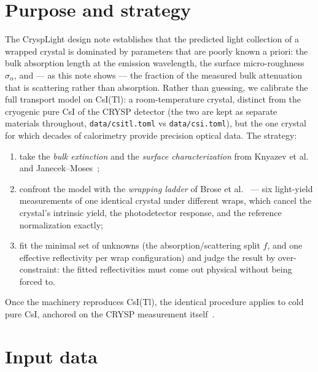\documentclass[11pt,a4paper]{article}
\newcommand{\csitl}{CsI(Tl)}
\newcommand{\sa}{\sigma_\alpha}
\begin{document}
\tableofcontents

\section{Purpose and strategy}
\label{sec:purpose}

The CryspLight design note establishes that the predicted light collection of a wrapped
crystal is dominated by parameters that are poorly known a priori: the bulk absorption
length at the emission wavelength, the surface micro-roughness $\sa$, and --- as this
note shows --- the fraction of the measured bulk attenuation that is scattering rather
than absorption. Rather than guessing, we calibrate the full transport model on
\csitl{}: a room-temperature crystal, distinct from the cryogenic pure CsI of the CRYSP
detector (the two are kept as separate materials throughout,
\texttt{data/csitl.toml} vs \texttt{data/csi.toml}), but the one crystal for which
decades of calorimetry provide precision optical data. The strategy:

\begin{enumerate}
  \item take the \emph{bulk extinction} and the \emph{surface characterization} from
    Knyazev et al.~\cite{knyazev2021} and Janecek--Moses~\cite{janecek2010};
  \item confront the model with the \emph{wrapping ladder} of Brose et
    al.~\cite{brose1998} --- six light-yield measurements of one identical crystal under
    different wraps, which cancel the crystal's intrinsic yield, the photodetector
    response, and the reference normalization exactly;
  \item fit the minimal set of unknowns (the absorption/scattering split $f$, and one
    effective reflectivity per wrap configuration) and judge the result by
    over-constraint: the fitted reflectivities must come out physical without being
    forced to.
\end{enumerate}
Once the machinery reproduces \csitl{}, the identical procedure applies to cold pure
CsI, anchored on the CRYSP measurement itself~\cite{soleti2024}.

\section{Input data}
\label{sec:data}
\end{document}
